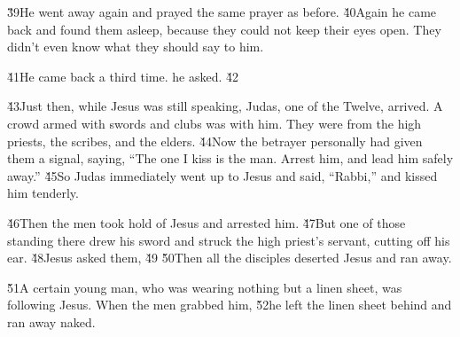 \v{39}He went away again and prayed the same prayer as before. \v{40}Again he came back and found them asleep, because they could not keep their eyes open. They didn't even know what they should say to him.

\v{41}He came back a third time.  he asked.  \v{42}

\v{43}Just then, while Jesus was still speaking, Judas, one of the Twelve, arrived. A crowd armed with swords and clubs was with him. They were from the high priests, the scribes, and the elders. \v{44}Now the betrayer personally had given them a signal, saying, ``The one I kiss is the man. Arrest him, and lead him safely away.'' \v{45}So Judas immediately went up to Jesus and said, ``Rabbi,'' and kissed him tenderly.

\v{46}Then the men took hold of Jesus and arrested him. \v{47}But one of those standing there drew his sword and struck the high priest's servant, cutting off his ear. \v{48}Jesus asked them,  \v{49} \v{50}Then all the disciples deserted Jesus and ran away.

\v{51}A certain young man, who was wearing nothing but a linen sheet, was following Jesus. When the men grabbed him, \v{52}he left the linen sheet behind and ran away naked.

